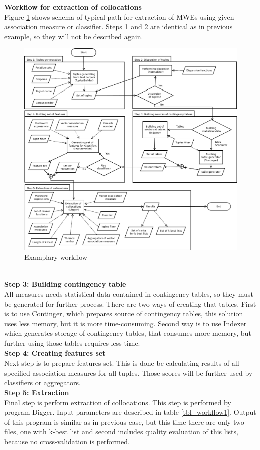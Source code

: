 \noindent \textbf{Workflow for extraction of collocations}
\\ Figure \ref{img_workflow2} shows schema of typical path for extraction of MWEs using given association measure or classifier.
Steps 1 and 2 are identical as in previous example, so they will not be described again.
\begin{figure}[ht]
	\centering
	\includegraphics[scale=0.4]{img/mewex_workflow2.png}
	\caption{Examplary workflow}
	\label{img_workflow2}
\end{figure}
\\ \textbf{Step 3: Building contingency table}\\
All measures needs statistical data contained in contingency tables, so they must be generated for further process. 
There are two ways of creating that tables. First is to use Continger, which prepares source of contingency tables, 
this solution uses less memory, but it is more time-consuming. Second way is to use Indexer which generates storage of contingency tables, 
that consumes more memory, but further using those tables requires less time.
\\ \textbf{Step 4: Creating features set}\\
Next step is to prepare features set. This is done be calculating results of all specified association measures for all tuples. 
Those scores will be further used by classifiers or aggregators.
\\ \textbf{Step 5: Extraction}\\
Final step is perform extraction of collocations. This step is performed by program Digger. Input parameters are described 
in table \ref{tbl_workflow1}. Output of this program is similar as in previous case, but this time there are only two files, 
one with k-best list and second includes quality evaluation of this lists, because no cross-validation is performed.


